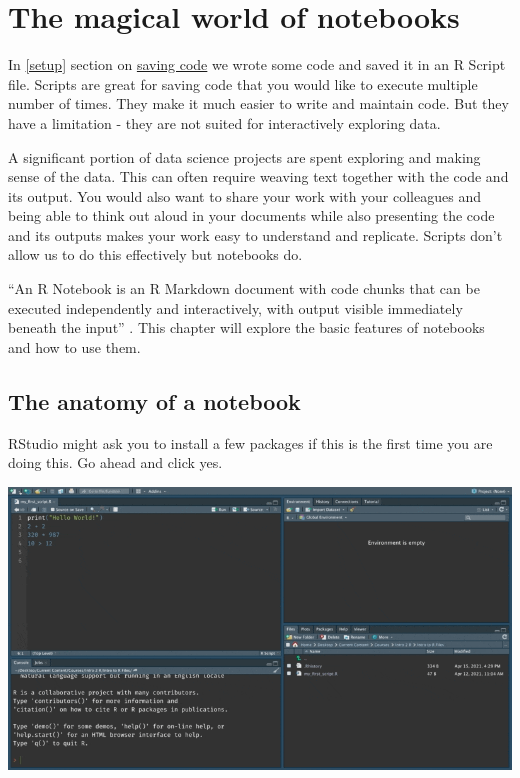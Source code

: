\documentclass[
]{book}
\begin{document}
\hypertarget{the-magical-world-of-notebooks}{%
\chapter{The magical world of notebooks}\label{the-magical-world-of-notebooks}}

In \ref{setup} section on \protect\hyperlink{saving-code}{saving code} we wrote some code and saved it in an R Script file. Scripts are great for saving code that you would like to execute multiple number of times. They make it much easier to write and maintain code. But they have a limitation - they are not suited for interactively exploring data.

A significant portion of data science projects are spent exploring and making sense of the data. This can often require weaving text together with the code and its output. You would also want to share your work with your colleagues and being able to think out aloud in your documents while also presenting the code and its outputs makes your work easy to understand and replicate. Scripts don't allow us to do this effectively but notebooks do.

``An R Notebook is an R Markdown document with code chunks that can be executed independently and interactively, with output visible immediately beneath the input'' \citep{xie2019}. This chapter will explore the basic features of notebooks and how to use them.

\hypertarget{the-anatomy-of-a-notebook}{%
\section{The anatomy of a notebook}\label{the-anatomy-of-a-notebook}}

RStudio might ask you to install a few packages if this is the first time you are doing this. Go ahead and click yes.

\includegraphics{assets/ch_2-notebooks/gifs/open_notebook.gif}
\end{document}
